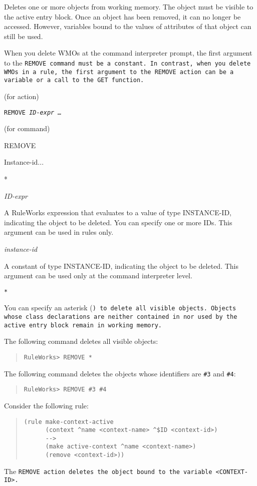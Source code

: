 {{Deletes one or more objects from working memory. The object must be
visible to the active entry block. Once an object has been removed, it
can no longer be accessed. However, variables bound to the values of
attributes of that object can still be used.

\begin{note}
  When you delete WMOs at the command interpreter prompt, the first
  argument to the \tt{REMOVE} command must be a constant.  In contrast,
  when you delete WMOs in a rule, the first argument to the \tt{REMOVE}
  action can be a variable or a call to the \tt{GET} function.
\end{note}

\Format (for action)

\tt{REMOVE} \it{ID-expr} \ldots

\Format (for command)

REMOVE {

Instance-id...

*
}

\Argument

\it{ID-expr}

A RuleWorks expression that evaluates to a value of type
INSTANCE-ID, indicating the object to be deleted. You can
specify one or more IDs. This argument can be used in rules
only.

\it{instance-id}

A constant of type INSTANCE-ID, indicating the object to be
deleted. This argument can be used only at the command
interpreter level.

\tt{*}

You can specify an asterisk (\tt*) to delete all visible
objects. Objects whose class declarations are neither
contained in nor used by the active entry block remain in
working memory.

\Example

The following command deletes all visible objects:
\begin{quote}
\begin{verbatim}
RuleWorks> REMOVE *
\end{verbatim}
\end{quote}
The following command deletes the objects whose identifiers
are \verb|#3| and \verb|#4|:
\begin{quote}
\begin{verbatim}
RuleWorks> REMOVE #3 #4
\end{verbatim}
\end{quote}
Consider the following rule:
\begin{quote}
\begin{verbatim}
(rule make-context-active
      (context ^name <context-name> ^$ID <context-id>)
      -->
      (make active-context ^name <context-name>)
      (remove <context-id>))
\end{verbatim}
\end{quote}
The \tt{REMOVE} action deletes the object bound to the variable
\verb|<CONTEXT-ID>|.

}}
